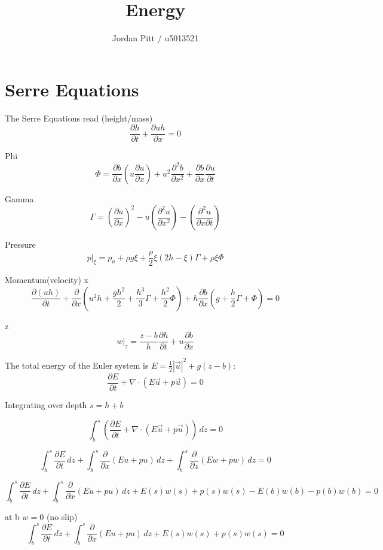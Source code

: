 \documentclass[12pt]{article}
\begin{document}
\title{Energy}
\author{Jordan Pitt / u5013521}

\section{Serre Equations}

The Serre Equations read
(height/mass)
\[\frac{\partial h}{\partial t} + \frac{\partial uh}{\partial x} = 0 \]

Phi
\[\Phi = \frac{\partial b}{\partial x}\left(u \frac{\partial u}{\partial x}\right) + u^2 \frac{\partial^2 b}{\partial x^2} + \frac{\partial b}{\partial x}\frac{\partial u}{\partial t}\]

Gamma
\[\Gamma = \left(\frac{\partial u}{\partial x} \right)^2 - u \left(\frac{\partial^2 u}{\partial x^2} \right) - \left(\frac{\partial^2 u}{\partial x \partial t} \right)\]

Pressure
\[p|_\xi = p_a + \rho g \xi + \frac{\rho}{2}\xi\left(2h - \xi\right)\Gamma + \rho \xi \Phi \]


Momentum(velocity)
x
\[ \frac{\partial (uh)}{\partial t} + \frac{\partial}{\partial x}\left(u^2 h + \frac{gh^2}{2} + \frac{h^3}{3}\Gamma + \frac{h^2}{2} \Phi\right) + h \frac{\partial b}{\partial x}\left(g + \frac{h}{2}\Gamma + \Phi\right) = 0\]

z
\[w|_z = \frac{z - b}{h} \frac{\partial h}{\partial t} + u \frac{\partial b}{\partial x}\]

The total energy of the Euler system is $E = \frac{1}{2} |\vec{u}|^2 + g(z - b)$:
\[\frac{\partial E}{\partial t} + \nabla \cdot \left(E\vec{u} + p\vec{u}\right) = 0\]

Integrating over depth $s = h + b$

\[ \int_b^s \left(\frac{\partial E}{\partial t} + \nabla \cdot \left(E\vec{u} + p\vec{u}\right)\right) \, dz =0\]

\[ \int_b^s \frac{\partial E}{\partial t} \, dz +  \int_b^s\frac{\partial}{\partial x} \left(Eu + pu\right) \, dz  +  \int_b^s\frac{\partial}{\partial z} \left(Ew + pw\right) \, dz =0\]

\[ \int_b^s \frac{\partial E}{\partial t} \, dz +  \int_b^s\frac{\partial}{\partial x} \left(Eu + pu\right) \, dz +  E(s)w(s) + p(s)w(s) - E(b)w(b) - p(b)w(b)  =0 \]

at b $w = 0$ (no slip) \\

\[ \int_b^{s} \frac{\partial E}{\partial t} \, dz +  \int_b^{s}\frac{\partial}{\partial x} \left(Eu + pu\right) \, dz +  E(s)w(s) + p(s)w(s) = 0\]
\end{document}
